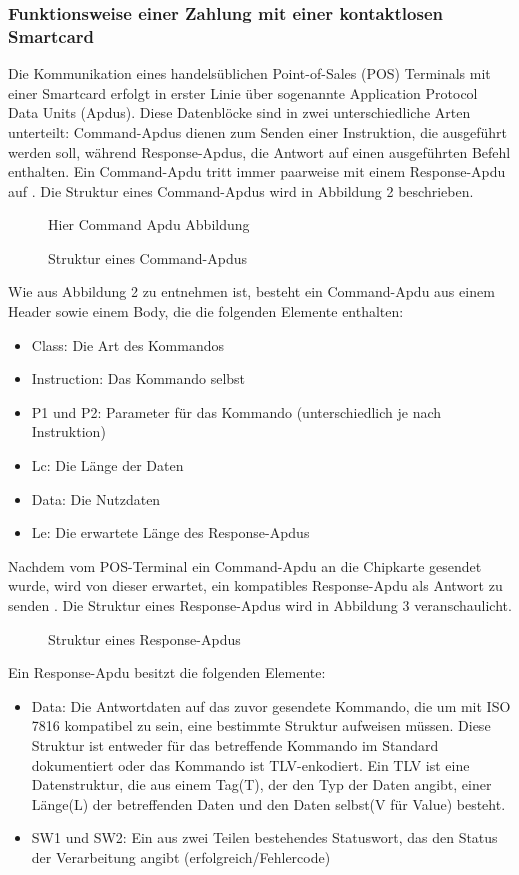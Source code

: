 \subsubsection{Funktionsweise einer Zahlung mit einer kontaktlosen Smartcard}

Die Kommunikation eines handelsüblichen Point-of-Sales (POS) Terminals mit einer Smartcard erfolgt in erster Linie über sogenannte Application Protocol Data Units (Apdus). Diese Datenblöcke sind in zwei unterschiedliche Arten unterteilt: Command-Apdus dienen zum Senden einer Instruktion, die ausgeführt werden soll, während Response-Apdus, die Antwort auf einen ausgeführten Befehl enthalten. Ein Command-Apdu tritt immer paarweise mit einem Response-Apdu auf \cite{iso7816-4}. 
Die Struktur eines Command-Apdus wird in Abbildung 2 beschrieben.

\begin{figure}[h]
	\centering Hier Command Apdu Abbildung
	\caption{Struktur eines Command-Apdus}
\end{figure}

Wie aus Abbildung 2 zu entnehmen ist, besteht ein Command-Apdu aus einem Header sowie einem Body, die die folgenden Elemente enthalten: 

\begin{itemize}
	\item Class: Die Art des Kommandos
	\item Instruction: Das Kommando selbst
	\item P1 und P2: Parameter für das Kommando (unterschiedlich je nach Instruktion)
	\item Lc: Die Länge der Daten
	\item Data: Die Nutzdaten
	\item Le: Die erwartete Länge des Response-Apdus
\end{itemize}

Nachdem vom POS-Terminal ein Command-Apdu an die Chipkarte gesendet wurde, wird von dieser erwartet, ein kompatibles Response-Apdu als Antwort zu senden . Die Struktur eines Response-Apdus wird in Abbildung 3 veranschaulicht.

\begin{figure}[h]
	\caption{Struktur eines Response-Apdus}
\end{figure}

Ein Response-Apdu besitzt die folgenden Elemente:

\begin{itemize}
	\item Data: Die Antwortdaten auf das zuvor gesendete Kommando, die um mit ISO 7816 kompatibel zu sein, eine bestimmte Struktur aufweisen müssen. Diese Struktur ist entweder für das betreffende Kommando im Standard dokumentiert oder das Kommando ist TLV-enkodiert. Ein TLV ist eine Datenstruktur, die aus einem Tag(T), der den Typ der Daten angibt, einer Länge(L) der betreffenden Daten und den Daten selbst(V für Value) besteht. 
	\item SW1 und SW2: Ein aus zwei Teilen bestehendes Statuswort, das den Status der Verarbeitung angibt (erfolgreich/Fehlercode)
\end{itemize}

